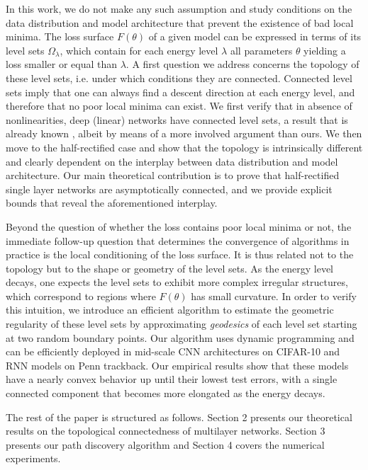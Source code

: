In this work, we do not make any such assumption and study conditions 
on the data distribution and model architecture that prevent the existence 
of bad local minima. 
The loss surface $F(\theta)$ of a given model can be expressed in terms of its level sets $\Omega_\lambda$, which contain for each energy level $\lambda$ all parameters $\theta$ yielding a loss smaller or equal than $\lambda$. A first question we address concerns the topology of these level sets, i.e. under which conditions they are connected. Connected level sets imply that one can always find a descent direction at each energy level, and therefore that no poor local minima can exist. We first verify that in absence of nonlinearities, deep (linear) networks have connected level sets, a result that is already known \cite{followupmit}, albeit by means of a more involved argument than ours. We then move to the half-rectified case and show that the topology is intrinsically different and clearly dependent on the interplay between data distribution and model architecture. Our main theoretical contribution is to prove that half-rectified single layer networks are asymptotically connected, and we provide explicit bounds that reveal the aforementioned interplay.

Beyond the question of whether the loss contains poor local minima or not, the immediate follow-up question that determines the convergence of algorithms in practice is the local conditioning of the loss surface. It is thus related not to the topology but to the shape or geometry of the level sets. As the energy level decays, one expects the level sets to exhibit more complex irregular structures, which correspond to regions where $F(\theta)$ has small curvature. In order to verify this intuition, we introduce an efficient algorithm to estimate the geometric regularity of these level sets by approximating \emph{geodesics} of each level set starting at two random boundary points. Our algorithm uses dynamic programming and can be efficiently deployed in mid-scale CNN architectures on CIFAR-10 and RNN models on Penn trackback. 
Our empirical results show that these models have a nearly convex behavior up until their lowest test errors, with a single connected component that becomes more elongated as the energy decays. 

The rest of the paper is structured as follows. Section 2 presents our theoretical results on the topological connectedness of multilayer networks. Section 3 presents our path discovery algorithm and Section 4 covers the numerical experiments. 













